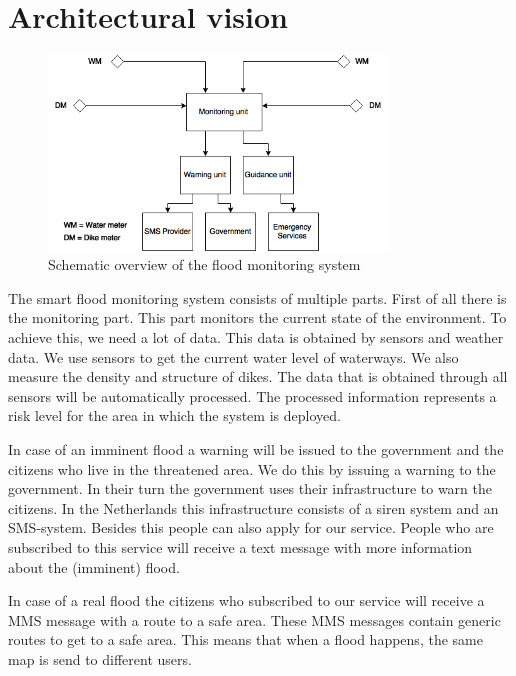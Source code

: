 \section{Architectural vision}

\begin{figure}[h]
\centering
\includegraphics[width=90mm]{images/architecturalVision.png}
\caption{Schematic overview of the flood monitoring system}
\label{fig:architectural-vision}
\end{figure}

The smart flood monitoring system consists of multiple parts. First of all there is the monitoring part. This part monitors the current state of the environment. To achieve this, we need a lot of data. This data is obtained by sensors and weather data. We use sensors to get the current water level of waterways. We also measure the density and structure of dikes. The data that is obtained through all sensors will be automatically processed. The processed information represents a risk level for the area in which the system is deployed.

In case of an imminent flood a warning will be issued to the government and the citizens who live in the threatened area. We do this by issuing a warning to the government. In their turn the government uses their infrastructure to warn the citizens. In the Netherlands this infrastructure consists of a siren system and an SMS-system. Besides this people can also apply for our service. People who are subscribed to this service will receive a text message with more information about the (imminent) flood. 

In case of a real flood the citizens who subscribed to our service will receive a MMS message with a route to a safe area. These MMS messages contain generic routes to get to a safe area. This means that when a flood happens, the same map is send to different users.
